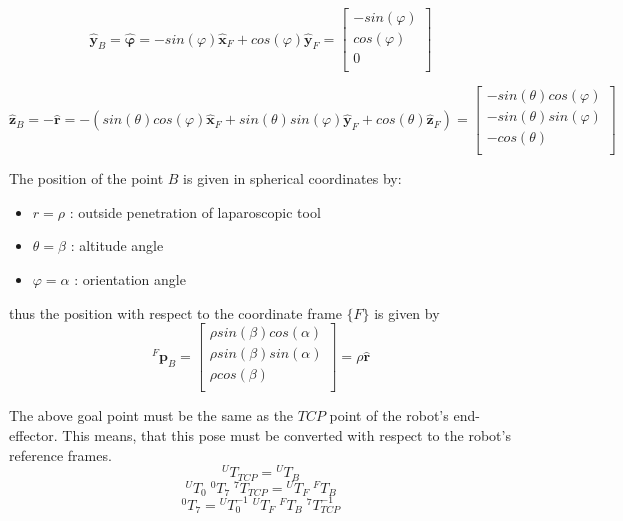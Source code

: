 \begin{equation}
\hat{\mathbf{y}}^{}_B = \hat{\mathbf{φ}} = -sin(φ)\hat{\mathbf{x}}^{}_F + cos(φ)\hat{\mathbf{y}}^{}_F
= \begin{bmatrix}
-sin(φ) \\
cos(φ) \\
0 \\
\end{bmatrix}
\end{equation}

\begin{equation}
\hat{\mathbf{z}}^{}_B = - \hat{\mathbf{r}} = - (sin(θ)cos(φ)\hat{\mathbf{x}}^{}_F + sin(θ)sin(φ)\hat{\mathbf{y}}^{}_F + cos(θ)\hat{\mathbf{z}}^{}_F)
= \begin{bmatrix}
-sin(θ)cos(φ) \\
-sin(θ)sin(φ) \\
-cos(θ) \\
\end{bmatrix}
\end{equation}

The position of the point $B$ is given in spherical coordinates by:
\begin{itemize}
	\item $r=ρ$ : outside penetration of laparoscopic tool
	\item $θ=β$ : altitude angle
	\item $φ=α$ : orientation angle
\end{itemize}
thus the position with respect to the coordinate frame $\lbrace F \rbrace$ is given by
\begin{equation}
{}^{F}\mathbf{p}^{}_B = \begin{bmatrix}
ρsin(β)cos(α) \\
ρsin(β)sin(α) \\
ρcos(β) \\
\end{bmatrix} = ρ \hat{\mathbf{r}}
\end{equation}

The above goal point must be the same as the $TCP$ point of the robot's end-effector. This means, that this pose must be converted with respect to the robot's reference frames.
\[
{}^{U}T^{}_{TCP} = {}^{U}T^{}_{B}
\]
\[
{}^{U}T^{}_{0} \; {}^{0}T^{}_{7} \; {}^{7}T^{}_{TCP} = {}^{U}T^{}_{F} \; {}^{F}T^{}_{B}
\]
\begin{equation}
{}^{0}T^{}_{7} = {}^{U}T^{-1}_{0} \; {}^{U}T^{}_{F} \; {}^{F}T^{}_{B} \; {}^{7}T^{-1}_{TCP}
\end{equation}

